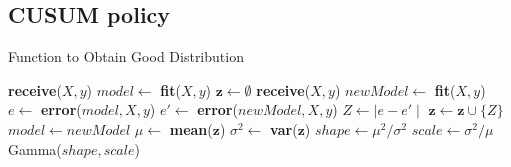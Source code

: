 \documentclass{mpaper}
\begin{document}
\begin{appendix}

\section{CUSUM policy}\label{gooddist}
\begin{algorithm}[H]
\caption{Function to Obtain Good Distribution}
\begin{algorithmic}
    \State \textbf{receive}($X, y$)
    \State $model \gets$ \textbf{fit}($X,y$)
    \State $\textbf{z} \gets \emptyset$
        \State \textbf{receive}($X, y$)
        \State $newModel \gets$ \textbf{fit}($X,y$)
        \State $e \gets$ \textbf{error}($model,X,y$)
        \State $e' \gets$ \textbf{error}($newModel,X,y$)
        \State $Z \gets \mid e - e' \mid$
        \State $\textbf{z} \gets \textbf{z} \cup \{Z\}$
        \State $model \gets newModel$
    \EndFor
    \State $\mu \gets$ \textbf{mean}($\textbf{z}$)
    \State $\sigma^2 \gets$ \textbf{var}($\textbf{z}$)
    \State $shape \gets \mu^2/\sigma^2$
    \State $scale \gets \sigma^2/\mu$\\
    \Return Gamma($shape, scale$)
\EndFunction
\end{algorithmic}
\end{algorithm}


\end{appendix}
\end{document}
